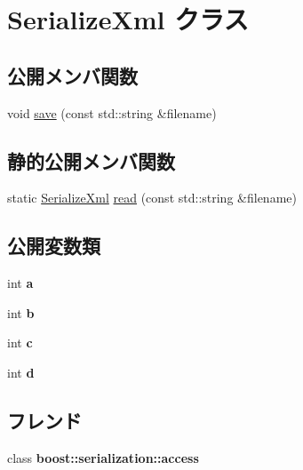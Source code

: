 \hypertarget{class_serialize_xml}{}\section{Serialize\+Xml クラス}
\label{class_serialize_xml}
\subsection*{公開メンバ関数}
\begin{DoxyCompactItemize}
\item 
void \hyperlink{class_serialize_xml_ac6a5a81d071402296475ddd0da70921d}{save} (const std\+::string \&filename)
\end{DoxyCompactItemize}
\subsection*{静的公開メンバ関数}
\begin{DoxyCompactItemize}
\item 
static \hyperlink{class_serialize_xml}{Serialize\+Xml} \hyperlink{class_serialize_xml_a1d991e024dabb1d367d34a66a62d82f1}{read} (const std\+::string \&filename)
\end{DoxyCompactItemize}
\subsection*{公開変数類}
\begin{DoxyCompactItemize}
\item 
\hypertarget{class_serialize_xml_a660f8805dfbc20b3028190f253f9a151}{}int {\bfseries a}\label{class_serialize_xml_a660f8805dfbc20b3028190f253f9a151}

\item 
\hypertarget{class_serialize_xml_a3a76f6dc73cefb63e66765f41a07a6fc}{}int {\bfseries b}\label{class_serialize_xml_a3a76f6dc73cefb63e66765f41a07a6fc}

\item 
\hypertarget{class_serialize_xml_a9b7c58c6f7d1ea648b183212a59bcd48}{}int {\bfseries c}\label{class_serialize_xml_a9b7c58c6f7d1ea648b183212a59bcd48}

\item 
\hypertarget{class_serialize_xml_a264924585d5afe7567c5c8b3a273ca09}{}int {\bfseries d}\label{class_serialize_xml_a264924585d5afe7567c5c8b3a273ca09}

\end{DoxyCompactItemize}
\subsection*{フレンド}
\begin{DoxyCompactItemize}
\item 
\hypertarget{class_serialize_xml_ac98d07dd8f7b70e16ccb9a01abf56b9c}{}class {\bfseries boost\+::serialization\+::access}\label{class_serialize_xml_ac98d07dd8f7b70e16ccb9a01abf56b9c}

\end{DoxyCompactItemize}


